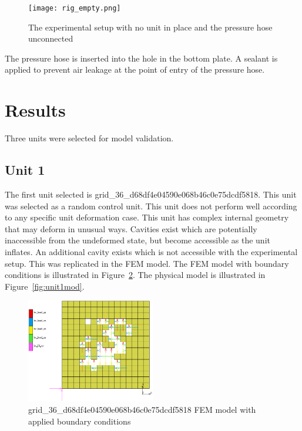 \begin{figure}[H]
	\centering
	\texttt{[image: rig\_empty.png]}
	\caption[The experimental setup without a unit]{The experimental setup with no unit in place and the pressure hose unconnected}
	\label{fig:expempty}
\end{figure}

The pressure hose is inserted into the hole in the bottom plate. A sealant is applied to prevent air leakage at the point of entry of the pressure hose.

\section{Results}

Three units were selected for model validation.

\subsection{Unit 1}

The first unit selected is grid\_36\_d68df4e04590e068b46c0e75dcdf5818. This unit was selected as a random control unit. This unit does not perform well according to any specific unit deformation case. This unit has complex internal geometry that may deform in unusual ways. Cavities exist which are potentially inaccessible from the undeformed state, but become accessible as the unit inflates. An additional cavity exists which is not accessible with the experimental setup. This was replicated in the FEM model. The FEM model with boundary conditions is illustrated in Figure~\ref{fig:unit1bc}. The physical model is illustrated in Figure~\ref{fig:unit1mod}.

\begin{figure}[H]
	\centering
	\includegraphics[width=0.5\textwidth]{unit1bc.png}
	\caption[FEM validation model of unit 1]{grid\_36\_d68df4e04590e068b46c0e75dcdf5818 FEM model with applied boundary conditions}
	\label{fig:unit1bc}
\end{figure}

